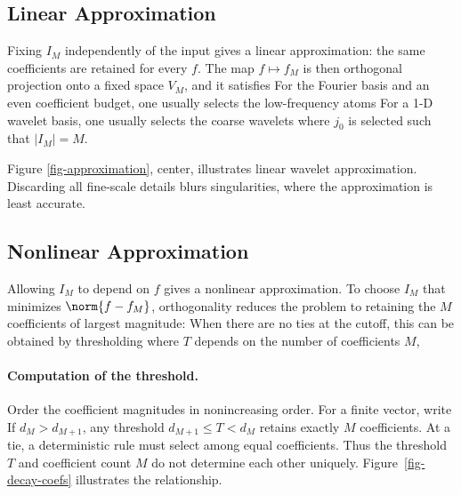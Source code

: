 \subsection{Linear Approximation}

Fixing $I_M$ independently of the input gives a linear approximation: the same coefficients are retained for every $f$. The map $f \mapsto f_M$ is then orthogonal projection onto a fixed space $V_M$, and it satisfies
For the Fourier basis and an even coefficient budget, one usually selects the low-frequency atoms
For a 1-D wavelet basis, one usually selects the coarse wavelets
where $j_0$ is selected such that $|I_M|=M$.


Figure \ref{fig-approximation}, center, illustrates linear wavelet approximation. Discarding all fine-scale details blurs singularities, where the approximation is least accurate.

\subsection{Nonlinear Approximation}

Allowing $I_M$ to depend on $f$ gives a nonlinear approximation. To choose $I_M$ that minimizes $\norm{f-f_M}$, orthogonality reduces the problem to retaining the $M$ coefficients of largest magnitude:
When there are no ties at the cutoff, this can be obtained by thresholding
where $T$ depends on the number of coefficients $M$, 

\paragraph{Computation of the threshold.}

Order the coefficient magnitudes in nonincreasing order. For a finite vector, write
If $d_M>d_{M+1}$, any threshold $d_{M+1}\leq T<d_M$ retains exactly $M$ coefficients. At a tie, a deterministic rule must select among equal coefficients. Thus the threshold $T$ and coefficient count $M$ do not determine each other uniquely. Figure~\ref{fig-decay-coefs} illustrates the relationship.


